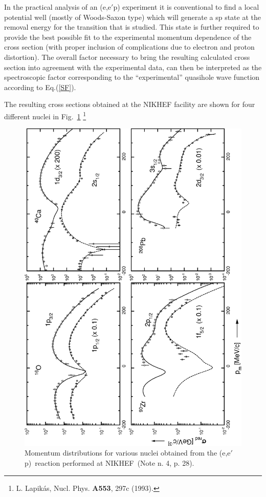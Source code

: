 In the practical analysis of an (e,e$'$p) experiment it is conventional to find
a local potential well (mostly of Woods-Saxon type) which will generate a sp
state at the removal energy for the transition that is studied.
This state is further required to provide the best possible fit to
the experimental momentum dependence of the cross section (with proper
inclusion of complications due to electron and proton 
distortion).
The overall factor necessary to bring the resulting calculated cross section
into agreement with the experimental data, can then be interpreted as the
spectroscopic factor corresponding to the ``experimental''
quasihole wave function
according to Eq.(\ref{SF}).



The resulting cross sections obtained at 
the NIKHEF facility are shown for four different nuclei
in Fig.~\ref{fig:louk1}%
\footnote{L. Lapik\'{a}s, Nucl. Phys. {\bf A553}, 297c (1993).}
\begin{figure}[tbb]
  \begin{center}
    \includegraphics[height=0.65\textheight,angle=-90]{plotprlands.eps}
    \end{center}
    \caption{\label{fig:louk1}
      Momentum distributions for various nuclei obtained from the
(e,e$'$p)\ reaction performed at NIKHEF~(Note n. 4, p. 28).}
\end{figure}
